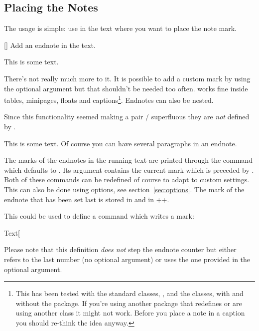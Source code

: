 \documentclass[load-preamble+]{cnltx-doc}
\begin{document}
\subsection{Placing the Notes}
The usage is simple: use  in the text where you want to place the
note mark.
\begin{commands}
  []
    Add an endnote in the text.
\end{commands}
\begin{example}
  This is some text.
\end{example}
There's not really much more to it.  It is possible to add a custom mark by
using the optional argument but that shouldn't be needed too often.
 works fine inside tables, minipages, floats and
captions\footnote{This has been tested with the standard classes,
  , and the  classes, with and without the
   package.  If you're using another package that redefines
   or are using another class it might not work.  Before you
  place a note in a caption you should re-think the idea anyway.}.  Endnotes
can also be nested.

Since this functionality seemed making a pair
/ superfluous they are \emph{not} defined by
\enotez.
\begin{example}
  This is some text.
  Of course you can have several paragraphs\endnote{\kant[1-3]} in an endnote.
\end{example}

The marks of the endnotes in the running text are printed through the command
 which defaults to .  Its argument
contains the current mark which is preceded by .  Both of
these commands can be redefined of course to adapt to custom settings.  This
can also be done using options, see section~\ref{sec:options}.  The mark of
the endnote that has been set last is stored in  and in
\verbcode+\@currentlabel+.

This could be used to define a command which writes a mark:
\begin{example}
  \makeatletter
  \def\endnotemark{\@ifnextchar[{\@endnotemark}{\@endnotemark[\theendnote]}}
  \def\@endnotemark[#1]{\enotezwritemark{\enmarkstyle#1}}
  \makeatother
  Text\endnotemark
\end{example}
Please note that this definition \emph{does not} step the endnote counter but
either refers to the last number (no optional argument) or uses the one
provided in the optional argument.
\end{document}
